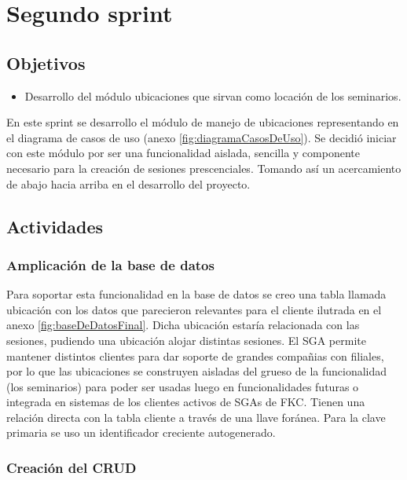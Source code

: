 \section{Segundo sprint} %
\label{sec:segundo_sprint}

\subsection{Objetivos}

\begin{itemize}
	\item Desarrollo del módulo ubicaciones que sirvan como locación de los seminarios.
\end{itemize}

En este sprint se desarrollo el módulo de manejo de ubicaciones representando en el diagrama de casos de uso (anexo \ref{fig:diagramaCasosDeUso}). Se decidió iniciar con este módulo por ser una funcionalidad aislada, sencilla y componente necesario para la creación de sesiones prescenciales. Tomando así un acercamiento de abajo hacia arriba en el desarrollo del proyecto.

\subsection{Actividades} %
\label{sub:actividades}

\subsubsection{Amplicación de la base de datos}

Para soportar esta funcionalidad en la base de datos se creo una tabla llamada ubicación con los datos que parecieron relevantes para el cliente ilutrada en el anexo \ref{fig:baseDeDatosFinal}. Dicha ubicación estaría relacionada con las sesiones, pudiendo una ubicación alojar distintas sesiones. El SGA permite mantener distintos clientes para dar soporte de grandes compañias con filiales, por lo que las ubicaciones se construyen aisladas del grueso de la funcionalidad (los seminarios) para poder ser usadas luego en funcionalidades futuras o integrada en sistemas de los clientes activos de SGAs de FKC. Tienen una relación directa con la tabla cliente a través de una llave foránea. Para la clave primaria se uso un identificador creciente autogenerado.

\subsubsection{Creación del CRUD}

